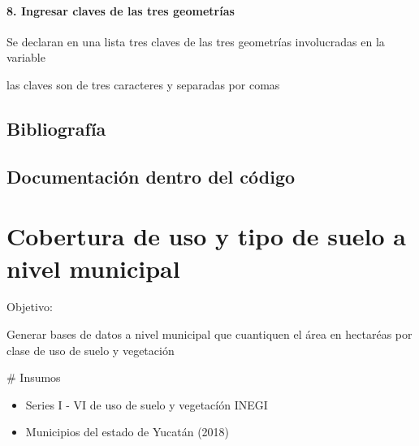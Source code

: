 \documentclass[letterpaper,10pt,spanish]{sphinxmanual}
\begin{document}
\subsubsection{8. Ingresar claves de las tres geometrías}
\label{\detokenize{nivel_geometrias:ingresar-claves-de-las-tres-geometrias}}
Se declaran en una lista tres claves de las tres geometrías involucradas
en la variable 

las claves son de tres caracteres y separadas por comas

\begin{sphinxVerbatim}[commandchars=\\\{\}]
\PYG{p}{[}\PYG{p}{]}
\end{sphinxVerbatim}


\section{Bibliografía}
\label{\detokenize{nivel_geometrias:bibliografia}}

\section{Documentación dentro del código}
\label{\detokenize{nivel_geometrias:documentacion-dentro-del-codigo}}

\chapter{Cobertura de uso y tipo de suelo a nivel municipal}
\label{\detokenize{usvmunicipal:cobertura-de-uso-y-tipo-de-suelo-a-nivel-municipal}}\label{\detokenize{usvmunicipal::doc}}
Objetivo:

Generar bases de datos  a nivel municipal que cuantiquen el área en hectaréas por clase
de uso de suelo y vegetación

\# Insumos
\begin{itemize}
\item {} 
Series I - VI de uso de suelo y vegetacíón INEGI

\item {} 
Municipios del estado de Yucatán (2018)

\end{itemize}
\end{document}
